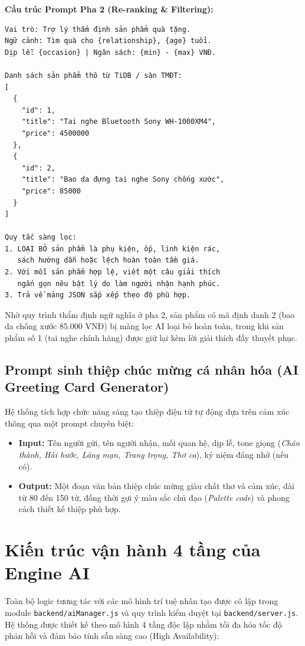 \begin{infobox}
\textbf{Cấu trúc Prompt Pha 2 (Re-ranking \& Filtering):}
\footnotesize
\begin{verbatim}
Vai trò: Trợ lý thẩm định sản phẩm quà tặng.
Ngữ cảnh: Tìm quà cho {relationship}, {age} tuổi.
Dịp lễ: {occasion} | Ngân sách: {min} - {max} VNĐ.

Danh sách sản phẩm thô từ TiDB / sàn TMĐT:
[
  {
    "id": 1,
    "title": "Tai nghe Bluetooth Sony WH-1000XM4",
    "price": 4500000
  },
  {
    "id": 2,
    "title": "Bao da đựng tai nghe Sony chống xước",
    "price": 85000
  }
]

Quy tắc sàng lọc:
1. LOẠI BỎ sản phẩm là phụ kiện, ốp, linh kiện rác,
   sách hướng dẫn hoặc lệch hoàn toàn tầm giá.
2. Với mỗi sản phẩm hợp lệ, viết một câu giải thích
   ngắn gọn nêu bật lý do làm người nhận hạnh phúc.
3. Trả về mảng JSON sắp xếp theo độ phù hợp.
\end{verbatim}
\end{infobox}

Nhờ quy trình thẩm định ngữ nghĩa ở pha 2, sản phẩm có mã định danh 2 (bao da chống xước 85.000 VNĐ) bị màng lọc AI loại bỏ hoàn toàn, trong khi sản phẩm số 1 (tai nghe chính hãng) được giữ lại kèm lời giải thích đầy thuyết phục.

\subsection{Prompt sinh thiệp chúc mừng cá nhân hóa (AI Greeting Card Generator)}
Hệ thống tích hợp chức năng sáng tạo thiệp điện tử tự động dựa trên cảm xúc thông qua một prompt chuyên biệt:
\begin{itemize}
    \item \textbf{Input:} Tên người gửi, tên người nhận, mối quan hệ, dịp lễ, tone giọng (\textit{Chân thành, Hài hước, Lãng mạn, Trang trọng, Thơ ca}), kỷ niệm đáng nhớ (nếu có).
    \item \textbf{Output:} Một đoạn văn bản thiệp chúc mừng giàu chất thơ và cảm xúc, dài từ 80 đến 150 từ, đồng thời gợi ý màu sắc chủ đạo (\textit{Palette code}) và phong cách thiết kế thiệp phù hợp.
\end{itemize}

\section{Kiến trúc vận hành 4 tầng của Engine AI}

Toàn bộ logic tương tác với các mô hình trí tuệ nhân tạo được cô lập trong module \texttt{backend/aiManager.js} và quy trình kiểm duyệt tại \texttt{backend/server.js}. Hệ thống được thiết kế theo mô hình 4 tầng độc lập nhằm tối đa hóa tốc độ phản hồi và đảm bảo tính sẵn sàng cao (High Availability):

